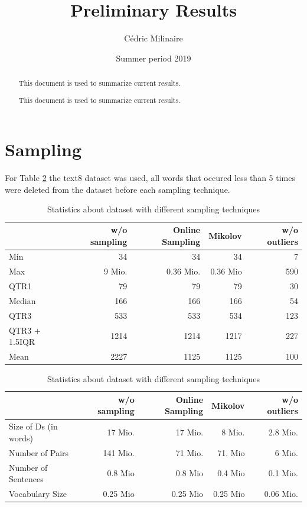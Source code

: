\documentclass{scrartcl}
\title{Preliminary Results}
\author{Cédric Milinaire}
\date{Summer period 2019}
\begin{document}
\begin{titlepage}
\maketitle
\end{titlepage} 
 \begin{abstract}
     This document is used to summarize current results. 
 \end{abstract}
\listoffigures
\listoftables
\newpage
 \begin{abstract}
     This document is used to summarize current results. 
 \end{abstract}
\section{Sampling}
For Table \ref{tab:sampling_stats} the text8 dataset was used, all words that occured less than 5 times were deleted from the dataset before each sampling technique.

\begin{table}[h]\centering
    \caption{Statistics about dataset with different sampling techniques}
    \begin{tabular}{l r r r r}%
        \toprule
      &    \textbf{w/o sampling} & \textbf{Online Sampling} & \textbf{Mikolov} & \textbf{w/o outliers}  \\%
        \midrule%
        Min     &   34 & 34 & 34 & 7 \\%
       Max    & 9 Mio. & 0.36 Mio. & 0.36 Mio & 590 \\%
      	QTR1      & 79 & 79 & 79&30\\%
         Median &166 & 166 & 166 & 54 \\%
       QTR3     & 533 & 533 & 534 & 123\\%
       QTR3 + 1.5IQR   & 1214 & 1214 & 1217 &227  \\%
               \bottomrule%
       Mean & 2227 & 1125 & 1125 & 100\\%
   \end{tabular}%
   \label{tab:stats_pairs}%
\end{table}
\begin{table}[h]\centering
    \caption{Statistics about dataset with different sampling techniques}
    \begin{tabular}{l r r r r}%
        \toprule
      &    \textbf{w/o sampling} & \textbf{Online Sampling} & \textbf{Mikolov} & \textbf{w/o outliers}  \\%
        \midrule%
        Size of Ds   (in words)     &  17 Mio.& 17 Mio. & 8 Mio.& 2.8 Mio.\\%
        Number of Pairs       & 141 Mio. & 71 Mio. & 71. Mio & 6 Mio. \\%
        Number of Sentences         & 0.8 Mio & 0.8 Mio & 0.4 Mio  & 0.1 Mio.\\%
        Vocabulary Size & 0.25 Mio & 0.25 Mio & 0.25 Mio & 0.06 Mio. \\%
        \bottomrule%
   \end{tabular}%
   \label{tab:sampling_stats}%
\end{table}
\newpage
\end{document}
